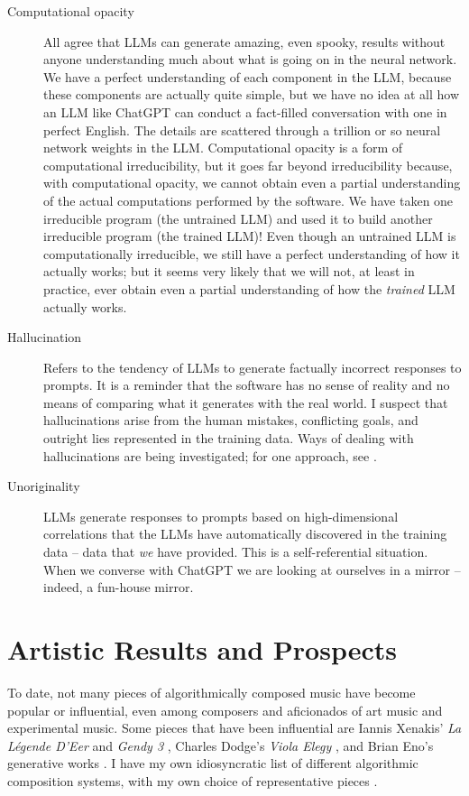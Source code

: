 \documentclass[11pt]{scrartcl}
\begin{document}
\begin{description}
\item[Computational opacity] All agree that LLMs can generate amazing, even spooky, results without anyone understanding much about what is going on in the neural network. We have a perfect understanding of each component in the LLM, because these components are actually quite simple, but we have no idea at all how an LLM like ChatGPT can conduct a fact-filled conversation with one in perfect English. The details are scattered through a trillion or so neural network weights in the LLM. Computational opacity is a form of computational irreducibility, but it goes far beyond irreducibility because, with computational opacity, we cannot obtain even a partial understanding of the actual computations performed by the software. We have taken one irreducible program (the untrained LLM) and used it to build another irreducible program (the trained LLM)! Even though an untrained LLM is computationally irreducible, we still have a perfect understanding of how it actually works; but it seems very likely that we will not, at least in practice, ever obtain even a partial understanding of how the \emph{trained} LLM actually works.
\item [Hallucination] Refers to the tendency of LLMs to generate factually incorrect responses to prompts. It is a reminder that the software has no sense of reality and no means of comparing what it generates with the real world. I suspect that hallucinations arise from the human mistakes, conflicting goals, and outright lies represented in the training data. Ways of dealing with hallucinations are being investigated; for one approach, see \parencite{christiano2017deep}.
\item [Unoriginality] LLMs generate responses to prompts based on high-dimensional correlations that the LLMs have automatically discovered in the training data -- data that \emph{we} have provided. This is a self-referential situation. When we converse with ChatGPT we are looking at ourselves in a mirror -- indeed, a fun-house mirror.
\end{description}

\section*{Artistic Results and Prospects}

To date, not many pieces of algorithmically composed music have become popular or influential, even among composers and aficionados of art music and experimental music. Some pieces that have been influential are Iannis Xenakis' \emph{La Légende D'Eer} \parencite{Solr-8143160} and \emph{Gendy 3} \parencite{gendy3},  Charles Dodge's \emph{Viola Elegy} \parencite{violaelegy}, and Brian Eno's generative works \parencite{eno1996generative, enochilvers}. I have my own idiosyncratic list of different algorithmic composition systems, with my own choice of representative pieces \parencite{rant}.
\end{document}
